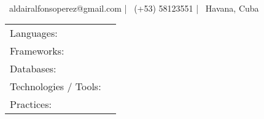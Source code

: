 \documentclass[]{awesome-cv}
\begin{document}
\begin{center}
	  \\
	\vspace{2mm}
	{\hspace{0.8cm}\faEnvelope\ aldairalfonsoperez@gmail.com}  |  {\faMobile\ (+53) 58123551}  |  {\faMapMarker\ Havana, Cuba}
\end{center}

\begin{cventries}
	\cventry
	{}
	{\def\arraystretch{1.15}{\begin{tabular}{ l l }
				Languages:                            & {\skill{ C\# (Advanced), Python, C, C++, SQL, JavaScript.}}                       \\
				Frameworks:                           & {\skill{ .Net, ASP.NET, Django, FastAPI.}}                                        \\
				Databases:                            & {\skill{ MySQL, PostgreSQL, SQLite.}}                                             \\
				Technologies / Tools: \hspace{0.05cm} & {\skill{ Visual Studio, Unity Editor, Git, Docker, npm.}}                         \\
				Practices:                            & {\skill{ Agile, Scrum, SOLID Principles, Test-Driven Development, Code Reviews.}} \\
			\end{tabular}}}
	{}
	{}
	{}
\end{cventries}
\vspace{-7mm}
\end{document}
